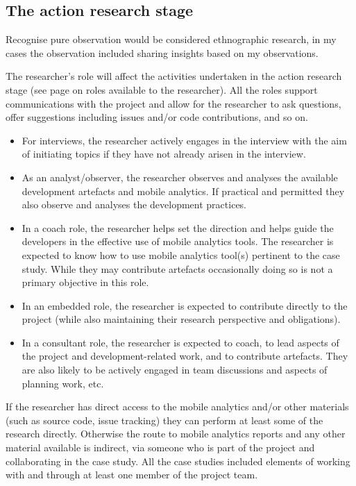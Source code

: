 \subsection{The action research stage}
 Recognise pure observation would be considered ethnographic research, in my cases the observation included sharing insights based on my observations. 

The researcher's role will affect the activities undertaken in the action research stage (see page \pageref{section-evaluation-through-action-research-method} on roles available to the researcher). All the roles support communications with the project and allow for the researcher to ask questions, offer suggestions including issues and/or code contributions, and so on. 
\begin{itemize}
    \itemsep0em
    \item For interviews, the researcher actively engages in the interview with the aim of initiating topics if they have not already arisen in the interview.
    \item As an analyst/observer, the researcher observes and analyses the available development artefacts and mobile analytics. If practical and permitted they also observe and analyses the development practices. 
    \item In a coach role, the researcher helps set the direction and helps guide the developers in the effective use of mobile analytics tools. The researcher is expected to know how to use mobile analytics tool(s) pertinent to the case study. While they may contribute artefacts occasionally doing so is not a primary objective in this role.
    \item In an embedded role, the researcher is expected to contribute directly to the project (while also maintaining their research perspective and obligations).
    \item In a consultant role, the researcher is expected to coach, to lead aspects of the project and development-related work, and to contribute artefacts. They are also likely to be actively engaged in team discussions and aspects of planning work, etc. 
\end{itemize}

If the researcher has direct access to the mobile analytics and/or other materials (such as source code, issue tracking) they can perform at least some of the research directly. Otherwise the route to mobile analytics reports and any other material available is indirect, via someone who is part of the project and collaborating in the case study. All the case studies included elements of working with and through at least one member of the project team.

